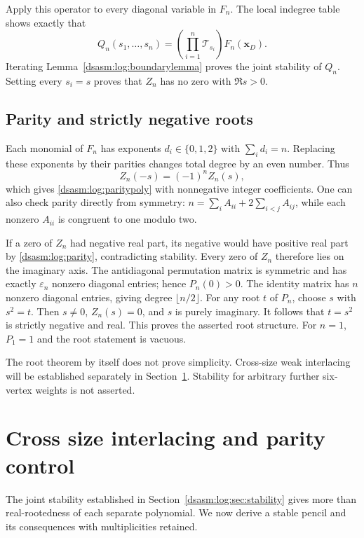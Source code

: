 \documentclass[11pt,letterpaper]{article}
\theoremstyle{remark}\newtheorem{remark}[theorem]{Remark}
\newcommand{\eps}{\varepsilon}\newcommand{\HH}{\mathcal H}\newcommand{\one}{\mathbf1}
\begin{document}
Apply this operator to every diagonal variable in $F_n$. The local
indegree table shows exactly that
\begin{equation}\label{dsasm:log:Qoperator}
 Q_n(s_1,\ldots,s_n)=
 \left(\prod_{i=1}^n\mathcal T_{s_i}\right)F_n(\mathbf x_D).
\end{equation}
Iterating Lemma~\ref{dsasm:log:boundarylemma} proves the joint stability of $Q_n$.
Setting every $s_i=s$ proves that $Z_n$ has no zero with $\Re s>0$.

\subsection{Parity and strictly negative roots}
Each monomial of $F_n$ has exponents $d_i\in\{0,1,2\}$ with
$\sum_i d_i=n$. Replacing these exponents by their parities changes
total degree by an even number. Thus
\begin{equation}\label{dsasm:log:parity}
 Z_n(-s)=(-1)^n Z_n(s),
\end{equation}
which gives \eqref{dsasm:log:paritypoly} with nonnegative integer coefficients.
One can also check parity directly from symmetry:
$n=\sum_i A_{ii}+2\sum_{i<j}A_{ij}$, while each nonzero $A_{ii}$ is
congruent to one modulo two.

If a zero of $Z_n$ had negative real part, its negative would have
positive real part by \eqref{dsasm:log:parity}, contradicting stability.
Every zero of $Z_n$ therefore lies on the imaginary axis. The
antidiagonal permutation matrix is symmetric and has exactly
$\eps_n$ nonzero diagonal entries; hence $P_n(0)>0$. The identity matrix
has $n$ nonzero diagonal entries, giving degree $\lfloor n/2\rfloor$.
For any root $t$ of $P_n$, choose $s$ with $s^2=t$. Then $s\ne0$,
$Z_n(s)=0$, and $s$ is purely imaginary. It follows that $t=s^2$ is
strictly negative and real. This proves the asserted root structure. For $n=1$, $P_1=1$ and the root statement is vacuous.

The root theorem by itself does not prove simplicity. Cross-size weak
interlacing will be established separately in Section~\ref{dsasm:log:sec:interlacing}.
Stability for arbitrary further six-vertex weights is not asserted.


\section{Cross size interlacing and parity control}
\label{dsasm:log:sec:interlacing}
The joint stability established in Section~\ref{dsasm:log:sec:stability} gives
more than real-rootedness of each separate polynomial. We now derive
a stable pencil and its consequences with multiplicities retained.
\end{document}

